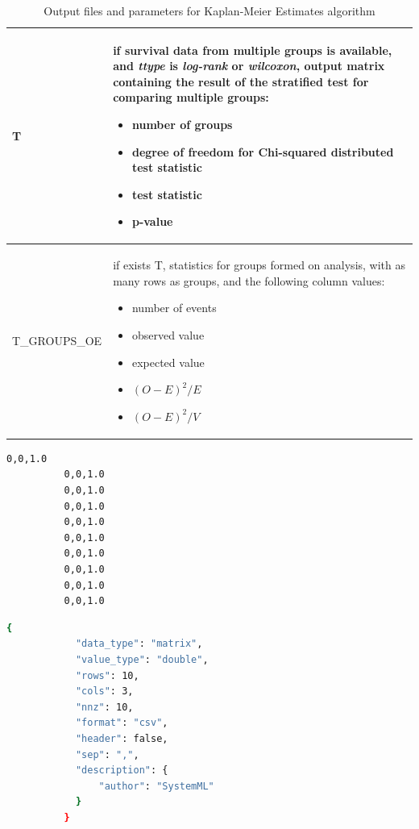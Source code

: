 \documentclass[11pt]{book} %
\begin{document}
\begin{table}[!ht]
{\begin{tabular}{|>{\centering\arraybackslash}m{}|m{}|}
            T & if survival data from multiple groups is available, and \emph{ttype} is \emph{log-rank} or \emph{wilcoxon}, output matrix containing the result of the stratified test for comparing multiple groups:
            \begin{itemize}
              \item number of groups
              \item degree of freedom for Chi-squared distributed test statistic
              \item test statistic
              \item p-value
            \end{itemize}
             \\ \hline
            T\_GROUPS\_OE & if exists T, statistics for groups formed on analysis, with as many rows as groups, and the following column values:
            \begin{itemize}
              \item number of events
              \item observed value
              \item expected value
              \item $(O-E)^2/E$
              \item $(O-E)^2/V$
            \end{itemize}
            \\ \hline
        \end{tabular}}
        \caption{Output files and parameters for Kaplan-Meier Estimates algorithm}
        \label{tab:KM_IO_files}
      \end{table}

      \begin{minipage}[b][7.7cm][b]{0.35\textwidth}

        \begin{lstlisting}[label=km_input_matrix, language=sh, caption=Input X matrix for KM Estimates model]
          0,0,1.0
          0,0,1.0
          0,0,1.0
          0,0,1.0
          0,0,1.0
          0,0,1.0
          0,0,1.0
          0,0,1.0
          0,0,1.0
          0,0,1.0
        \end{lstlisting}

      \end{minipage}
      \begin{minipage}[b][7.7cm][b]{0.6\textwidth}

        \begin{lstlisting}[label=km_input_matrix_meta, language=sh, caption=Input X metadata matrix for KM Estimates model]
          {
            "data_type": "matrix",
            "value_type": "double",
            "rows": 10,
            "cols": 3,
            "nnz": 10,
            "format": "csv",
            "header": false,
            "sep": ",",
            "description": {
                "author": "SystemML"
            }
          }
        \end{lstlisting}

      \end{minipage}
\end{document}
